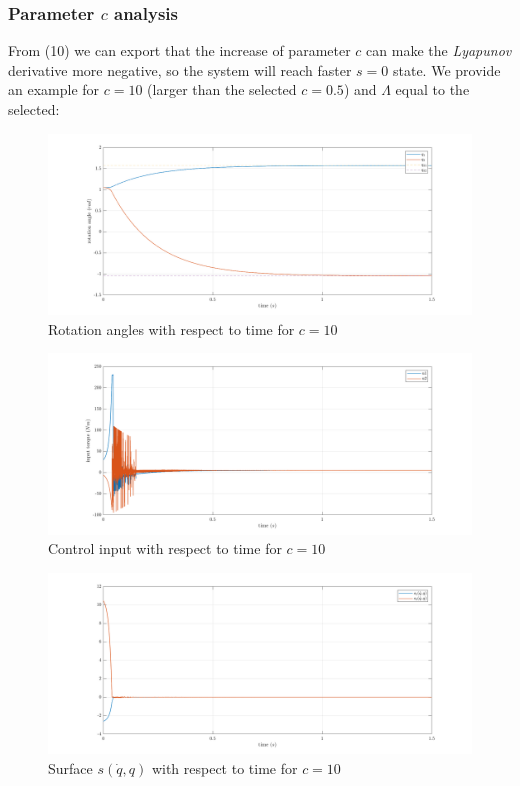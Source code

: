 \documentclass[a4paper]{article}
\begin{document}
\subsubsection{Parameter $c$ analysis}
From (10) we can export that the increase of parameter $c$ can make the \textit{Lyapunov} derivative more negative, so the system 
will reach faster $s=0$ state. We provide an example for $c=10$ (larger than the selected $c=0.5$) and $\Lambda$ equal to the selected:
\begin{figure}[H]
    \centering
    \includegraphics[width=15cm]{fig/sim1/qc10.png}
    \caption{Rotation angles with respect to time for $c=10$}
\end{figure}
\begin{figure}[H]
    \centering
    \includegraphics[width=15cm]{fig/sim1/uc10.png}
    \caption{Control input with respect to time for $c=10$}
\end{figure}
\begin{figure}[H]
    \centering
    \includegraphics[width=15cm]{fig/sim1/sc10.png}
    \caption{Surface $s(\dot{q}, q)$ with respect to time for $c=10$}
\end{figure}
\end{document}
